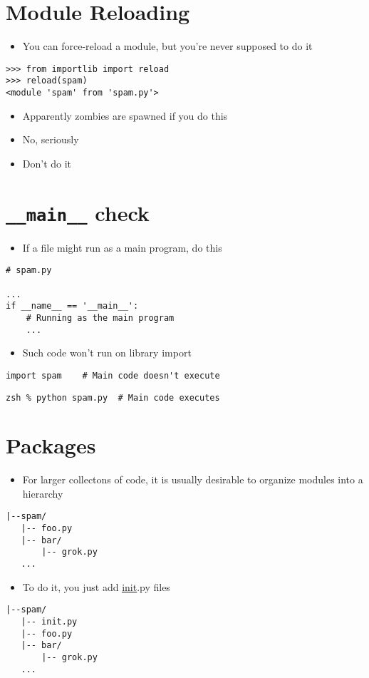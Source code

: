 \documentclass[11pt]{article}
\begin{document}
\section*{Module Reloading}
\label{sec:orgheadline12}
\begin{itemize}
\item You can force-reload a module, but you're never
supposed to do it
\end{itemize}
\begin{verbatim}
>>> from importlib import reload
>>> reload(spam)
<module 'spam' from 'spam.py'>
\end{verbatim}
\begin{itemize}
\item Apparently zombies are spawned if you do this
\item No, seriously
\item Don't do it
\end{itemize}

\section*{\texttt{\_\_main\_\_} check}
\label{sec:orgheadline13}
\begin{itemize}
\item If a file might run as a main program, do this
\end{itemize}
\begin{verbatim}
# spam.py

...
if __name__ == '__main__':
    # Running as the main program
    ...
\end{verbatim}
\begin{itemize}
\item Such code won't run on library import
\end{itemize}
\begin{verbatim}
import spam    # Main code doesn't execute
\end{verbatim}

\begin{verbatim}
zsh % python spam.py  # Main code executes
\end{verbatim}

\section*{Packages}
\label{sec:orgheadline16}
\begin{itemize}
\item For larger collectons of code, it is usually
desirable to organize modules into a hierarchy
\end{itemize}
\begin{verbatim}
|--spam/
   |-- foo.py
   |-- bar/
       |-- grok.py
   ...
\end{verbatim}
\begin{itemize}
\item To do it, you just add \uline{\uline{init}}.py files
\end{itemize}
\begin{verbatim}
|--spam/
   |-- init.py
   |-- foo.py
   |-- bar/
       |-- grok.py
   ...
\end{verbatim}
\end{document}
